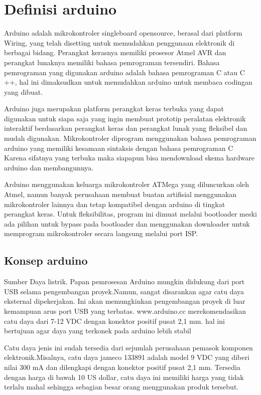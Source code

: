 \section{Definisi arduino}
Arduino adalah mikrokontroler singleboard opensource, berasal dari platform Wiring, yang telah disetting untuk memudahkan penggunaan elektronik di berbagai bidang. Perangkat kerasnya memiliki prosesor Atmel AVR dan perangkat lunaknya memiliki bahasa pemrograman tersendiri. Bahasa pemrograman yang digunakan arduino adalah bahasa pemrograman C atau C ++, hal ini dimaksudkan untuk memudahkan arduino untuk membaca codingan yang dibuat.


Arduino juga merupakan platform perangkat keras terbuka yang dapat digunakan untuk siapa saja yang ingin membuat prototip peralatan elektronik interaktif berdasarkan perangkat keras dan perangkat lunak yang fleksibel dan mudah digunakan. Mikrokontroler diprogram menggunakan bahasa pemrograman arduino yang memiliki kesamaan sintaksis dengan bahasa pemrograman C Karena sifatnya yang terbuka maka siapapun bisa mendownload skema hardware arduino dan membangunnya.

Arduino menggunakan keluarga mikrokontroler ATMega yang diluncurkan oleh Atmel, namun banyak perusahaan membuat buatan artifisial menggunakan mikrokontroler lainnya dan tetap kompatibel dengan arduino di tingkat perangkat keras. Untuk fleksibilitas, program ini dimuat melalui bootloader meski ada pilihan untuk bypass pada bootloader dan menggunakan downloader untuk memprogram mikrokontroler secara langsung melalui port ISP.

\subsection{Konsep arduino}
	Sumber Daya listrik. Papan pemrosesan Arduino mungkin didukung dari port USB selama pengembangan proyek.Namun, sangat disarankan agar catu daya eksternal dipekerjakan. Ini akan memungkinkan pengembangan proyek di luar kemampuan arus port USB yang terbatas. www.arduino.cc merekomendasikan catu daya dari 7-12 VDC dengan konektor positif pusat 2,1 mm. hal ini bertujuan agar daya yang terkonek pada arduino lebih stabil

	Catu daya jenis ini sudah tersedia dari sejumlah perusahaan pemasok komponen elektronik.Misalnya, catu daya jameco 133891 adalah model 9 VDC yang diberi nilai 300 mA dan dilengkapi dengan konektor positif pusat 2,1 mm. Tersedia dengan harga di bawah 10 US dollar, catu daya ini memiliki harga yang tidak terlalu mahal sehingga sebagian besar orang menggunakan produk tersebut.